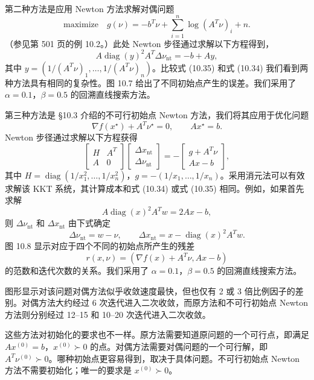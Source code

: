 \documentclass[UTF8, 12pt, fontset=fandol, oneside]{ctexart}
\begin{document}
第二种方法是应用 Newton 方法求解对偶问题
\[
\mbox{maximize}\quad g(\nu)=-b^T\nu+\sum_{i=1}^n\log(A^T\nu)_i+n.
\]
（参见第 501 页的例 10.2。）此处 Newton 步径通过求解以下方程得到，
\begin{equation}
A\operatorname{diag}(y)^2A^T\Delta\nu_{\mathrm{nt}}=-b+Ay,
\tag{10.35}
\end{equation}
其中 $y=(1/(A^T\nu)_1,\ldots,1/(A^T\nu)_n)$。比较式 (10.35) 和式 (10.34) 我们看到两种方法具有相同的复杂性。图 10.7 给出了不同初始点产生的误差。我们采用了 $\alpha=0.1$，$\beta=0.5$ 的回溯直线搜索方法。

第三种方法是 \S10.3 介绍的不可行初始点 Newton 方法，我们将其应用于优化问题
\[
\nabla f(x^\star)+A^T\nu^\star=0,\qquad Ax^\star=b.
\]
Newton 步径通过求解以下方程获得
\[
\begin{bmatrix}
H&A^T\\
A&0
\end{bmatrix}
\begin{bmatrix}
\Delta x_{\mathrm{nt}}\\
\Delta\nu_{\mathrm{nt}}
\end{bmatrix}
=-
\begin{bmatrix}
g+A^T\nu\\
Ax-b
\end{bmatrix},
\]
其中 $H=\operatorname{diag}(1/x_1^2,\ldots,1/x_n^2)$，$g=-(1/x_1,\ldots,1/x_n)$。采用消元法可以有效求解该 KKT 系统，其计算成本和式 (10.34) 或式 (10.35) 相同。例如，如果首先求解
\[
A\operatorname{diag}(x)^2A^Tw=2Ax-b,
\]
则 $\Delta\nu_{\mathrm{nt}}$ 和 $\Delta x_{\mathrm{nt}}$ 由下式确定
\[
\Delta\nu_{\mathrm{nt}}=w-\nu,\qquad
\Delta x_{\mathrm{nt}}=x-\operatorname{diag}(x)^2A^Tw.
\]
图 10.8 显示对应于四个不同的初始点所产生的残差
\[
r(x,\nu)=(\nabla f(x)+A^T\nu,Ax-b)
\]
的范数和迭代次数的关系。我们采用了 $\alpha=0.1$，$\beta=0.5$ 的回溯直线搜索方法。

图形显示对该问题对偶方法似乎收敛速度最快，但也仅有 2 或 3 倍比例因子的差别。对偶方法大约经过 6 次迭代进入二次收敛，而原方法和不可行初始点 Newton 方法则分别经过 12--15 和 10--20 次迭代进入二次收敛。

这些方法对初始化的要求也不一样。原方法需要知道原问题的一个可行点，即满足 $Ax^{(0)}=b$，$x^{(0)}\succ0$ 的点。对偶方法需要对偶问题的一个可行解，即 $A^T\nu^{(0)}\succ0$。哪种初始点更容易得到，取决于具体问题。不可行初始点 Newton 方法不需要初始化；唯一的要求是 $x^{(0)}\succ0$。
\end{document}
